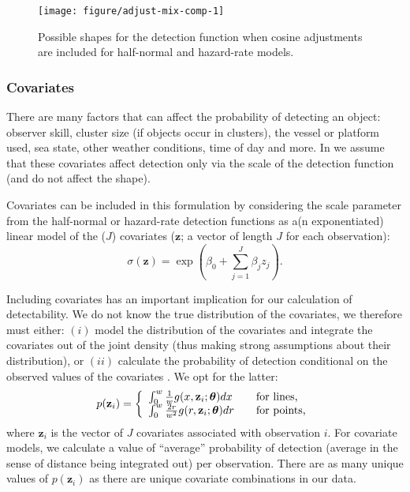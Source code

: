 \documentclass[article]{jss}\usepackage[]{graphicx}\usepackage[]{color}
\makeatletter
\def\maxwidth{ %
  \ifdim\Gin@nat@width>\linewidth
    \linewidth
  \else
    \Gin@nat@width
  \fi
}
\makeatother
\begin{document}
\begin{figure}
\begin{center}
\begin{Schunk}

\texttt{[image: figure/adjust-mix-comp-1]} \end{Schunk}
\caption{Possible shapes for the detection function when cosine adjustments are included for half-normal and hazard-rate models.}
\label{fig:keyadj}
\end{center}
\end{figure}



\subsubsection{Covariates}

There are many factors that can affect the probability of detecting an object: observer skill, cluster size (if objects occur in clusters), the vessel or platform used, sea state, other weather conditions, time of day and more. In  we assume that these covariates affect detection only via the scale of the detection function (and do not affect the shape).

Covariates can be included in this formulation by considering the scale parameter from the half-normal or hazard-rate detection functions as a(n exponentiated) linear model of the ($J$) covariates ($\mathbf{z}$; a vector of length $J$ for each observation):
$$
\sigma(\mathbf{z}) = \exp(\beta_0 + \sum_{j=1}^J \beta_j z_j).
$$

Including covariates has an important implication for our calculation of detectability. We do not know the true distribution of the covariates, we therefore must either: $(i)$ model the distribution of the covariates and integrate the covariates out of the joint density (thus making strong assumptions about their distribution), or $(ii)$ calculate the probability of detection conditional on the observed values of the covariates \citep{Marques:2003vb}. We opt for the latter:
$$
p(\mathbf{z}_i) = \left\{
\begin{array}{l l}
\int_0^w \frac{1}{w} g(x, \mathbf{z}_i; \boldsymbol{\theta}) dx & \quad \text{for lines,} \\
\int_0^w \frac{2r}{w^2} g(r, \mathbf{z}_i; \boldsymbol{\theta}) dr & \quad \text{for points,}
\end{array} \right.
$$
where $\mathbf{z}_i$ is the vector of $J$ covariates associated with observation $i$. For covariate models, we calculate a value of ``average'' probability of detection (average in the sense of distance being integrated out) per observation. There are as many unique values of $p(\mathbf{z}_i)$ as there are unique covariate combinations in our data.
\end{document}
